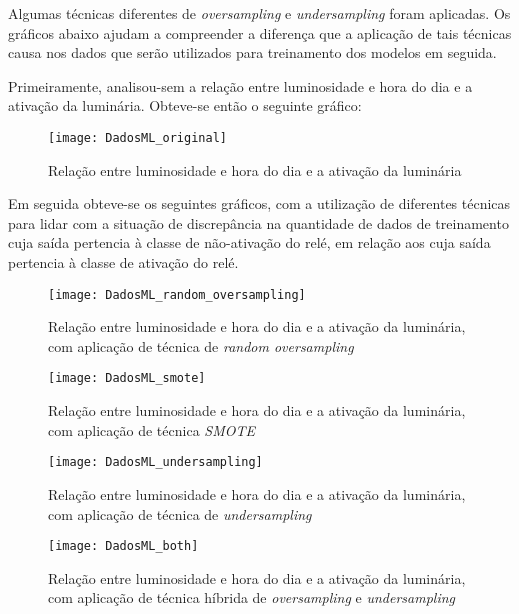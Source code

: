 			Algumas técnicas diferentes de \emph{oversampling} e \emph{undersampling} foram aplicadas. Os gráficos abaixo ajudam a compreender a diferença que a aplicação de tais técnicas causa nos dados que serão utilizados para treinamento dos modelos em seguida.

			Primeiramente, analisou-sem a relação entre luminosidade e hora do dia e a ativação da luminária. Obteve-se então o seguinte gráfico:

			\begin{figure}[H]
				\centering
				\caption{Relação entre luminosidade e hora do dia e a ativação da luminária}
				\texttt{[image: DadosML\_original]}
				\label{fig:DadosML_original}
			\end{figure}

			Em seguida obteve-se os seguintes gráficos, com a utilização de diferentes técnicas para lidar com a situação de discrepância na quantidade de dados de treinamento cuja saída pertencia à classe de não-ativação do relé, em relação aos cuja saída pertencia à classe de ativação do relé.

			\begin{figure}[H]
				\centering
				\caption{Relação entre luminosidade e hora do dia e a ativação da luminária, com aplicação de técnica de \emph{random oversampling}}
				\texttt{[image: DadosML\_random\_oversampling]}
				\label{fig:DadosML_random_oversampling}
			\end{figure}

			\begin{figure}[H]
				\centering
				\caption{Relação entre luminosidade e hora do dia e a ativação da luminária, com aplicação de técnica \emph{SMOTE} \cite{SMOTE}}
				\texttt{[image: DadosML\_smote]}
				\label{fig:DadosML_smote}
			\end{figure}

			\begin{figure}[H]
				\centering
				\caption{Relação entre luminosidade e hora do dia e a ativação da luminária, com aplicação de técnica de \emph{undersampling}}
				\texttt{[image: DadosML\_undersampling]}
				\label{fig:DadosML_undersampling}
			\end{figure}

			\begin{figure}[H]
				\centering
				\caption{Relação entre luminosidade e hora do dia e a ativação da luminária, com aplicação de técnica híbrida de \emph{oversampling} e \emph{undersampling}}
				\texttt{[image: DadosML\_both]}
				\label{fig:DadosML_both}
			\end{figure}

